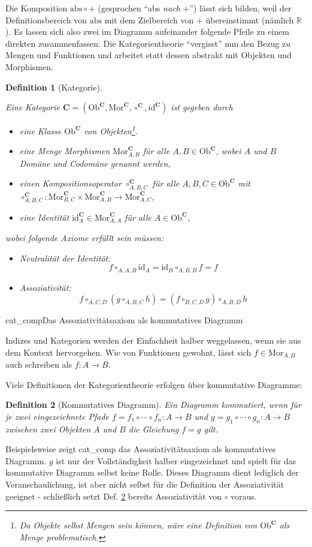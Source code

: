 \documentclass[a4paper, bibgerm]{article}
\newcommand\abb{}
\newcommand\fig{}
\newcommand\ato{\rightarrow}
\newtheorem{defini}{Definition}
\newcommand{\defi}[2]{%
  \begin{defini}[#1]
    \label{def:#1}
    #2
  \end{defini}
}
\newcommand{\dref}[1]{Def. \ref{def:#1}}
\begin{document}
Die Komposition $\mathrm{abs} \circ +$ (gesprochen "`abs \textit{nach} +"') lässt
sich bilden, weil der Definitionsbereich von $\mathrm{abs}$ mit dem
Zielbereich von $+$ übereinstimmt (nämlich $\mathbb{R}$). Es lassen sich
also zwei im Diagramm aufeinander folgende Pfeile zu einem direkten
zusammenfassen. Die Kategorientheorie "`vergisst"' nun den Bezug zu
Mengen und Funktionen und arbeitet statt dessen abstrakt mit Objekten
und Morphismen.

\defi{Kategorie}{
Eine Kategorie $\mathbf{C} = (\mathrm{Ob}^\mathbf{C}, \mathrm{Mor}^\mathbf{C},
\circ^\mathbf{C}, \mathrm{id}^\mathbf{C})$ ist gegeben durch 
\begin{itemize}
\item eine Klasse $\mathrm{Ob}^\mathbf{C}$ von Objekten\footnote{Da Objekte selbst Mengen
    sein können, wäre eine Definition von $\mathrm{Ob}^\mathbf{C}$ als Menge problematisch.}.
\item eine Menge Morphismen $\mathrm{Mor}^\mathbf{C}_{A,B}$ für alle $ A,B \in
  \mathrm{Ob}^\mathbf{C}$, wobei $A$ und $B$ Domäne und Codomäne genannt werden,
\item einen Kompositionsoperator $\circ^\mathbf{C}_{A,B,C}$ für alle $
  A,B,C \in \mathrm{Ob}^\mathbf{C}$ mit \\
  $\circ^\mathbf{C}_{A,B,C} : \mathrm{Mor}^\mathbf{C}_{B,C} \times
  \mathrm{Mor}^\mathbf{C}_{A,B} \rightarrow \mathrm{Mor}^\mathbf{C}_{A,C}$,
\item eine Identität $\mathrm{id}^\mathbf{C}_A \in \mathrm{Mor}^\mathbf{C}_{A,A}$ für alle $ A \in \mathrm{Ob}^\mathbf{C}$,
\end{itemize}
wobei folgende Axiome erfüllt sein müssen:
\begin{itemize}
\item Neutralität der Identität: $$f \circ_{A,A,B} \mathrm{id}_A = \mathrm{id}_B \circ_{A,B,B} f = f$$
\item Assoziativität:
  $$f \circ_{A,C,D} (g \circ_{A,B,C} h) = (f \circ_{B,C,D} g) \circ_{A,B,D}h$$
\end{itemize}
}

\fig{cat_comp}{Das Assoziativitätsaxiom als kommutatives Diagramm}

Indizes und Kategorien werden der Einfachheit halber weggelassen, wenn
sie aus dem Kontext hervorgehen. Wie von Funktionen gewohnt, lässt sich
$f \in \mathrm{Mor}_{A,B}$ auch schreiben als $f : A \ato B$.

Viele Definitionen der Kategorientheorie erfolgen über kommutative
Diagramme: \defi{Kommutatives Diagramm}{ Ein Diagramm kommutiert, wenn
  für je zwei eingezeichnete Pfade $f=f_1 \circ \cdots \circ f_n : A
  \rightarrow B$ und $g=g_1 \circ \cdots \circ g_n : A \rightarrow B$
  zwischen zwei Objekten $A$ und $B$ die Gleichung $f=g$ gilt.  }
Beispielsweise zeigt \abb{cat_comp} das Assoziativitätsaxiom als
kommutatives Diagramm. $g$ ist nur der Vollständigkeit halber
eingezeichnet und spielt für das kommutative Diagramm selbst keine
Rolle. Dieses Diagramm dient lediglich der Veranschaulichung, ist aber
nicht selbst für die Definition der Assoziativität geeignet -
schließlich setzt \dref{Kommutatives Diagramm} bereits Assoziativität
von $\circ$ voraus.
\end{document}
